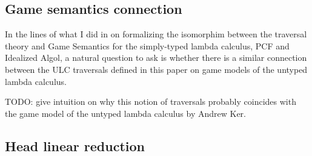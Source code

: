 \documentclass{article}
\theoremstyle{definition}
\begin{document}
\subsection{Game semantics connection}

In the lines of what I did in \cite{BlumPhd} on formalizing the isomorphim between the traversal theory and Game Semantics for the simply-typed lambda calculus, PCF and Idealized Algol, a natural question to ask is whether there is a similar connection between the ULC traversals defined in this paper on game models of the untyped lambda calculus.

TODO: give intuition on why this notion of traversals probably coincides with the game model of the untyped lambda calculus by Andrew Ker.

\subsection{Head linear reduction}





\end{document}
